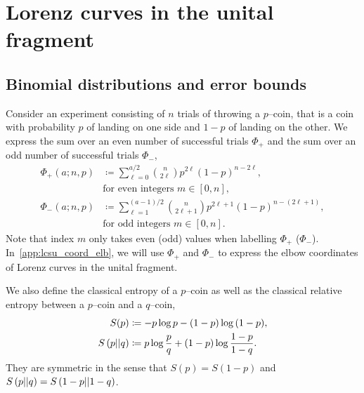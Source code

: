 
\section{Lorenz curves in the unital fragment}
\label{app:lcsu_technical}

\subsection{Binomial distributions and error bounds}\label{app:phi}
Consider an experiment consisting of $n$ trials of throwing a $p$--coin, that is a coin with probability $p$ of landing on one side and $1-p$ of landing on the other.
We express the sum over an even number of successful trials $\Phi_+$ and the sum over an odd number of successful trials $\Phi_-$,
\begin{align}	
	\Phi_+(a; n, p) &\coloneqq \sum\limits_{\ell=0}^{a/2} \binom{n}{2\ell} p^{2\ell} (1-p)^{n-2\ell}, \nonumber\\ 
	&\text{for even integers } m\in[0,n], \label{eq:fp_app} \\
	\Phi_-(a; n, p) &\coloneqq \sum\limits_{\ell=1}^{(a-1)/2} \binom{n}{2\ell+1} p^{2\ell+1} (1-p)^{n-(2\ell+1)}, \nonumber\\ 
	&\text{for odd integers }m\in[0,n]. \label{eq:fn_app}
\end{align}
Note that index $m$ only takes even (odd) values when labelling $\Phi_+$ ($\Phi_-$).
In~\cref{app:lcsu_coord_elb}, we will use $\Phi_+$ and $\Phi_-$ to express the elbow coordinates of Lorenz curves in the unital fragment.

We also define the classical entropy of a $p$--coin as well as the classical relative entropy between a $p$--coin and a $q$--coin,
\begin{align}
	S(p) &\coloneqq -p\log{p} -(1-p)\log{(1-p)}, \label{eq:ent}\\
	S\left( p \middle\vert\middle\vert q \right) &\coloneqq p \log{\frac{p}{q}} + (1-p) \log{\frac{1-p}{1-q}}. \label{eq:ent_rel}
\end{align}
They are symmetric in the sense that $S(p) = S(1-p)$ and $S\left( p \middle\vert\middle\vert q \right) = S\left( 1-p \middle\vert\middle\vert 1-q \right)$.

